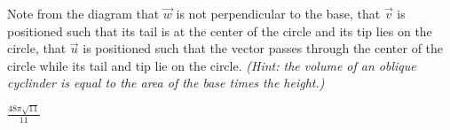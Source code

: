 \begin{Exercise}[
name={},
title={}, 
difficulty=0,
origin={\cite{YL}}]
\begin{multicols}{2}
\begin{tikzpicture}
\end{tikzpicture}
Note from the diagram that $\vec{w}$ is not perpendicular to the base,
that $\vec{v}$ is positioned such that its tail is at the center of the circle and its tip lies on the circle,
that $\vec{u}$ is positioned such that the vector passes through the center of the circle while its tail and tip lie on the circle.
\textit{(Hint: the volume of an oblique cyclinder is equal to the area of the base times the height.)}
\EndCurrentQuestion
\end{multicols}
\end{Exercise}

\begin{Answer}
$\frac{48\pi\sqrt{11}}{11}$
\end{Answer}
